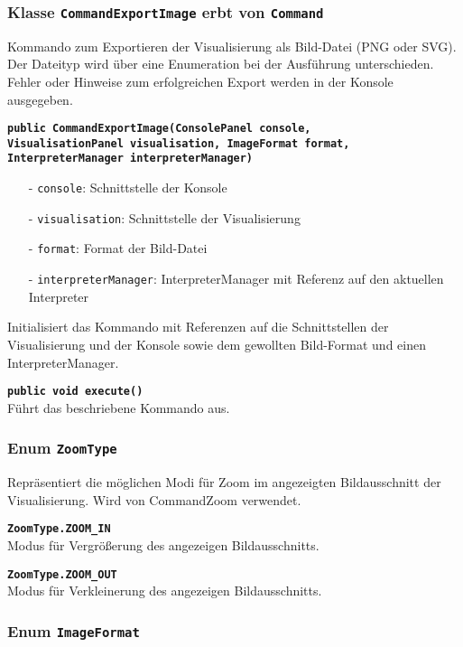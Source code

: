 \documentclass[parskip=full,11pt,twoside]{scrartcl}
\begin{document}
\subsubsection{Klasse \texttt{CommandExportImage} erbt von \texttt{Command}}

Kommando zum Exportieren der Visualisierung als Bild-Datei (PNG oder SVG). Der Dateityp wird über eine Enumeration bei der Ausführung unterschieden. Fehler oder Hinweise zum erfolgreichen Export werden in der Konsole ausgegeben.

\textbf{\texttt{public CommandExportImage(ConsolePanel console,\\VisualisationPanel visualisation, ImageFormat format, InterpreterManager interpreterManager)}}
\begin{itemize}[noitemsep]
	\item[-] \texttt{console}: Schnittstelle der Konsole
	\item[-] \texttt{visualisation}: Schnittstelle der Visualisierung
	\item[-] \texttt{format}: Format der Bild-Datei
	\item[-] \texttt{interpreterManager}: InterpreterManager mit Referenz auf den aktuellen Interpreter
\end{itemize}
Initialisiert das Kommando mit Referenzen auf die Schnittstellen der Visualisierung und der Konsole sowie dem gewollten Bild-Format und einen InterpreterManager.

\textbf{\texttt{public void execute()}}\\
Führt das beschriebene Kommando aus.

\subsubsection{Enum \texttt{ZoomType}}

Repräsentiert die möglichen Modi für Zoom im angezeigten Bildausschnitt der Visualisierung. Wird von CommandZoom verwendet.

\textbf{\texttt{ZoomType.ZOOM\_IN}}\\
Modus für Vergrößerung des angezeigen Bildausschnitts.

\textbf{\texttt{ZoomType.ZOOM\_OUT}}\\
Modus für Verkleinerung des angezeigen Bildausschnitts.

\subsubsection{Enum \texttt{ImageFormat}}
\end{document}
